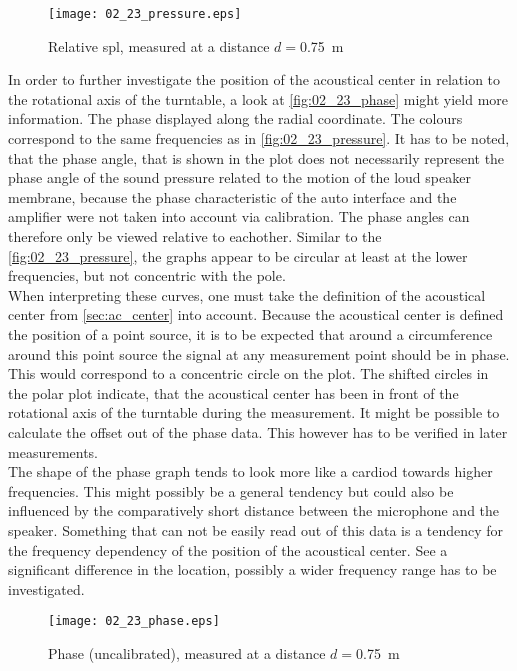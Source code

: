 \begin{figure}[htbp]
	\centering
	\texttt{[image: 02\_23\_pressure.eps]}
	\caption{Relative \gls{spl}, measured at a distance \(d=\)\SI{0.75}{\meter}}
		\label{fig:02_23_pressure}
\end{figure}

In order to further investigate the position of the acoustical center in relation to the rotational axis of the turntable, a look at \autoref{fig:02_23_phase} might yield more information. The phase displayed along the radial coordinate. The colours correspond to the same frequencies as in \autoref{fig:02_23_pressure}. It has to be noted, that the phase angle, that is shown in the plot does not necessarily represent the phase angle of the sound pressure related to the motion of the loud speaker membrane, because the phase characteristic of the auto interface and the amplifier were not taken into account via calibration. The phase angles can therefore only be viewed relative to eachother. Similar to the \autoref{fig:02_23_pressure}, the graphs appear to be circular at least at the lower frequencies, but not concentric with the pole.\\
When interpreting these curves, one must take the definition of the acoustical center from \autoref{sec:ac_center} into account. Because the acoustical center is defined the position of a point source, it is to be expected that around a circumference around this point source the signal at any measurement point should be in phase. This would correspond to a concentric circle on the plot. The shifted circles in the polar plot indicate, that the acoustical center has been in front of the rotational axis of the turntable during the measurement. It might be possible to calculate the offset out of the phase data. This however has to be verified in later measurements.\\
The shape of the phase graph tends to look more like a cardiod towards higher frequencies. This might possibly be a general tendency but could also be influenced by the comparatively short distance between the microphone and the speaker. Something that can not be easily read out of this data is a tendency for the frequency dependency of the position of the acoustical center. See a significant difference in the location, possibly a wider frequency range has to be investigated.

\begin{figure}[htbp]
	\centering
	\texttt{[image: 02\_23\_phase.eps]}
	\caption{Phase (uncalibrated), measured at a distance \(d=\)\SI{0.75}{\meter}}
		\label{fig:02_23_phase}
\end{figure}
